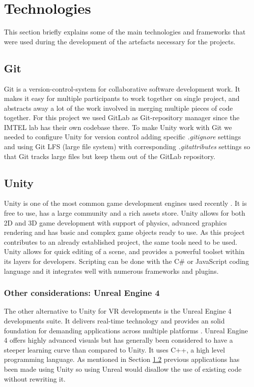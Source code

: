 \section{Technologies}
\label{sec:technologies}
This section briefly explains some of the main technologies and frameworks that were used during the development of the artefacts necessary for the projects. 

\subsection{Git}
Git is a version-control-system for collaborative software development work. It makes it easy for multiple participants to work together on single project, and abstracts away a lot of the work involved in merging multiple pieces of code together. For this project we used GitLab \cite{GitLab} as Git-repository manager since the IMTEL lab has their own codebase there. To make Unity work with Git we needed to configure Unity for version control adding specific \textit{.gitignore} settings and using Git LFS (large file system) with corresponding \textit{.gitattributes} settings so that Git tracks large files but keep them out of the GitLab repository. 

\subsection{Unity}
\label{section: untiy}
Unity is one of the most common game development engines used recently \cite{unity}. It is free to use, has a large community and a rich assets store. Unity allows for both 2D and 3D game development with support of physics, advanced graphics rendering and has basic and complex game objects ready to use. As this project contributes to an already established project, the same tools need to be used. Unity allows for quick editing of a scene, and provides a powerful toolset within its layers for developers. Scripting can be done with the C\# or JavaScript coding language and it integrates well with numerous frameworks and plugins.

\subsubsection{Other considerations: Unreal Engine 4}
The other alternative to Unity for VR developments is the Unreal Engine 4 developments suite. It delivers real-time technology and provides an solid foundation for demanding applications across multiple platforms \cite{unrealEngine}. Unreal Engine 4 offers highly advanced visuals but has generally been considered to have a steeper learning curve than compared to Unity. It uses C++, a high level programming language. As mentioned in Section \ref{section: untiy} previous applications has been made using Unity so using Unreal would disallow the use of existing code without rewriting it.       

